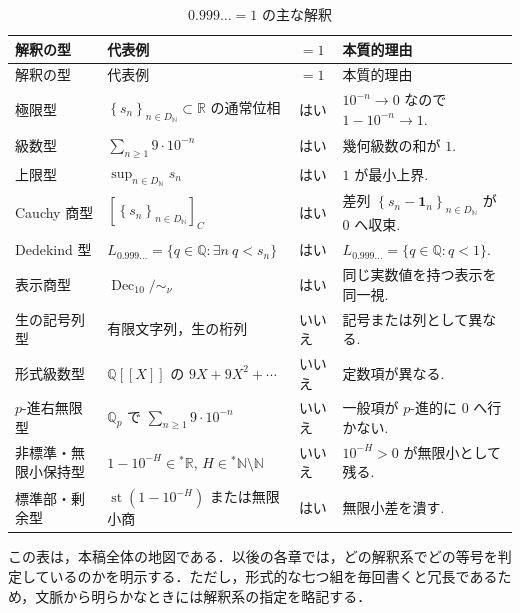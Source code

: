 \documentclass[a4paper,11pt]{ltjsarticle}
\theoremstyle{jpdef}
\theoremstyle{jpthm}
\newcommand{\N}{\mathbb{N}}
\newcommand{\Q}{\mathbb{Q}}
\newcommand{\R}{\mathbb{R}}
\newcommand{\Dec}{\operatorname{Dec}_{10}}
\newcommand{\st}{\operatorname{st}}
\newcommand{\DN}{D_{\N}}
\newcommand{\seq}[2]{\left\{#1\right\}_{#2}}
\begin{document}
\begin{longtable}{L{28mm}L{47mm}C{18mm}L{55mm}}
\caption{\(0.999\ldots=1\) の主な解釈}\label{tab:intro-main}\\
\toprule
解釈の型 & 代表例 & \(=1\) & 本質的理由\\
\midrule
\endfirsthead
\toprule
解釈の型 & 代表例 & \(=1\) & 本質的理由\\
\midrule
\endhead
極限型 & \(\seq{s_n}{n\in\DN}\subset\R\) の通常位相 & はい & \(10^{-n}\to0\) なので \(1-10^{-n}\to1\).\\
級数型 & \(\sum_{n\ge1}9\cdot10^{-n}\) & はい & 幾何級数の和が \(1\).\\
上限型 & \(\sup_{n\in\DN}s_n\) & はい & \(1\) が最小上界.\\
Cauchy 商型 & \([\seq{s_n}{n\in\DN}]_C\) & はい & 差列 \(\seq{s_n-\mathbf1_n}{n\in\DN}\) が \(0\) へ収束.\\
Dedekind 型 & \(L_{0.999\ldots}=\{q\in\Q:\exists n\ q<s_n\}\) & はい & \(L_{0.999\ldots}=\{q\in\Q:q<1\}\).\\
表示商型 & \(\Dec/\sim_\nu\) & はい & 同じ実数値を持つ表示を同一視.\\
生の記号列型 & 有限文字列，生の桁列 & いいえ & 記号または列として異なる.\\
形式級数型 & \(\Q[[X]]\) の \(9X+9X^2+\cdots\) & いいえ & 定数項が異なる.\\
\(p\)-進右無限型 & \(\Q_p\) で \(\sum_{n\ge1}9\cdot10^{-n}\) & いいえ & 一般項が \(p\)-進的に \(0\) へ行かない.\\
非標準・無限小保持型 & \(1-10^{-H}\in{}^{\ast}\R\), \(H\in{}^{\ast}\N\setminus\N\) & いいえ & \(10^{-H}>0\) が無限小として残る.\\
標準部・剰余型 & \(\st(1-10^{-H})\) または無限小商 & はい & 無限小差を潰す.\\
\bottomrule
\end{longtable}

この表は，本稿全体の地図である．以後の各章では，どの解釈系でどの等号を判定しているのかを明示する．ただし，形式的な七つ組を毎回書くと冗長であるため，文脈から明らかなときには解釈系の指定を略記する．
\end{document}
